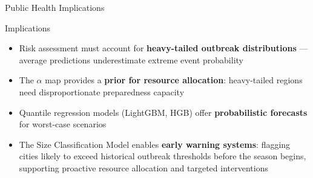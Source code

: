 \documentclass[10pt,aspectratio=169]{beamer}
\begin{document}
\begin{frame}{Public Health Implications}
    \begin{block}{Implications}
        \begin{itemize}
            \item Risk assessment must account for \textbf{heavy-tailed outbreak distributions} --- average predictions underestimate extreme event probability
            \item The $\alpha$ map provides a \textbf{prior for resource allocation}: heavy-tailed regions need disproportionate preparedness capacity
            \item Quantile regression models (LightGBM, HGB) offer \textbf{probabilistic forecasts} for worst-case scenarios
            \item The Size Classification Model enables \textbf{early warning systems}: flagging cities likely to exceed historical outbreak thresholds before the season begins, supporting proactive resource allocation and targeted interventions
        \end{itemize}
    \end{block}
\end{frame}
\end{document}
